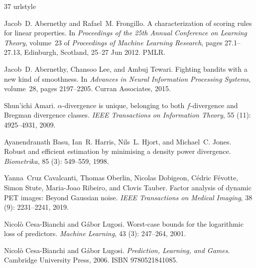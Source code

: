 \documentclass[11pt,oneside,a4paper]{article}
\theoremstyle{plain}
\theoremstyle{definition}
\theoremstyle{remark}
\begin{document}
\begin{thebibliography}{37}
\providecommand{\natexlab}[1]{#1}
\providecommand{\url}[1]{\texttt{#1}}
\expandafter\ifx\csname urlstyle\endcsname\relax
  \providecommand{\doi}[1]{doi: #1}\else
  \providecommand{\doi}{doi: \begingroup \urlstyle{rm}\Url}\fi

Jacob~D. Abernethy and Rafael~M. Frongillo.
\newblock A characterization of scoring rules for linear properties.
\newblock In \emph{Proceedings of the 25th Annual Conference on Learning Theory}, volume~23 of \emph{Proceedings of Machine Learning Research}, pages 27.1--27.13, Edinburgh, Scotland, 25--27 Jun 2012. PMLR.

Jacob~D. Abernethy, Chansoo Lee, and Ambuj Tewari.
\newblock Fighting bandits with a new kind of smoothness.
\newblock In \emph{Advances in Neural Information Processing Systems}, volume~28, pages 2197--2205. Curran Associates, 2015.

Shun'ichi Amari.
\newblock $\alpha$-divergence is unique, belonging to both $f$-divergence and {Bregman} divergence classes.
\newblock \emph{IEEE Transactions on Information Theory}, 55 (11): 4925--4931, 2009.

Ayanendranath Basu, Ian~R. Harris, Nils~L. Hjort, and Michael~C. Jones.
\newblock Robust and efficient estimation by minimising a density power divergence.
\newblock \emph{Biometrika}, 85 (3): 549--559, 1998.

Yanna~Cruz Cavalcanti, Thomas Oberlin, Nicolas Dobigeon, C{\'e}dric F{\'e}votte, Simon Stute, Maria-Joao Ribeiro, and Clovis Tauber.
\newblock Factor analysis of dynamic {PET} images: {B}eyond {G}aussian noise.
\newblock \emph{IEEE Transactions on Medical Imaging}, 38 (9): 2231--2241, 2019.

Nicol{\`o} Cesa-Bianchi and G{\'a}bor Lugosi.
\newblock Worst-case bounds for the logarithmic loss of predictors.
\newblock \emph{Machine Learning}, 43 (3): 247--264, 2001.

Nicol{\`o} Cesa-Bianchi and G{\'a}bor Lugosi.
\newblock \emph{Prediction, Learning, and Games}.
\newblock Cambridge University Press, 2006.
\newblock ISBN 9780521841085.


\end{thebibliography}
\end{document}
